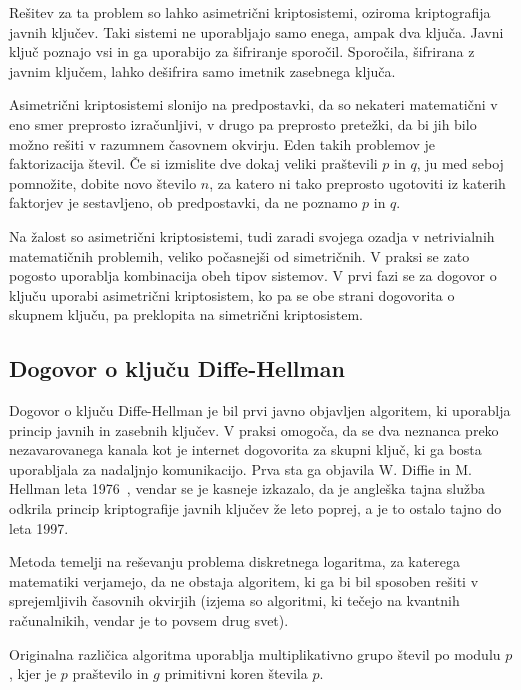 \documentclass[12pt,a4paper,openany,tikz]{book}
\theoremstyle{plain}
\theoremstyle{definition}
\begin{document}
Rešitev za ta problem so lahko asimetrični kriptosistemi, oziroma kriptografija javnih ključev. Taki sistemi ne uporabljajo samo enega, ampak dva ključa. Javni ključ poznajo vsi in ga uporabijo za šifriranje sporočil. Sporočila, šifrirana z javnim ključem, lahko dešifrira samo imetnik zasebnega ključa.

Asimetrični kriptosistemi slonijo na predpostavki, da so nekateri matematični v eno smer preprosto izračunljivi, v drugo pa preprosto pretežki, da bi jih bilo možno rešiti v razumnem časovnem okvirju. Eden takih problemov je faktorizacija števil. Če si izmislite dve dokaj veliki praštevili $p$ in $q$, ju med seboj pomnožite, dobite novo število $n$, za katero ni tako preprosto ugotoviti iz katerih faktorjev je sestavljeno, ob predpostavki, da ne poznamo $p$ in $q$.

Na žalost so asimetrični kriptosistemi, tudi zaradi svojega ozadja v netrivialnih matematičnih problemih, veliko počasnejši od simetričnih. V praksi se zato pogosto uporablja kombinacija obeh tipov sistemov. V prvi fazi se za dogovor o ključu uporabi asimetrični kriptosistem, ko pa se obe strani dogovorita o skupnem ključu, pa preklopita na simetrični kriptosistem.

\subsection*{Dogovor o ključu Diffe-Hellman}
\label{sub:Dogovor o kljucu Diffe-Hellman}

Dogovor o ključu Diffe-Hellman je bil prvi javno objavljen algoritem, ki uporablja princip javnih in zasebnih ključev. V praksi omogoča, da se dva neznanca preko nezavarovanega kanala kot je internet dogovorita za skupni ključ, ki ga bosta uporabljala za nadaljnjo komunikacijo. Prva sta ga objavila W. Diffie in M. Hellman leta 1976~\cite{diffie1976new}, vendar se je kasneje izkazalo, da je angleška tajna služba odkrila princip kriptografije javnih ključev že leto poprej, a je to ostalo tajno do leta 1997.

Metoda temelji na reševanju problema diskretnega logaritma, za katerega matematiki verjamejo, da ne obstaja algoritem, ki ga bi bil sposoben rešiti v sprejemljivih časovnih okvirjih (izjema so algoritmi, ki tečejo na kvantnih računalnikih, vendar je to povsem drug svet).

Originalna različica algoritma uporablja multiplikativno grupo števil po modulu $p$, kjer je $p$ praštevilo in $g$ primitivni koren števila $p$.
\end{document}
